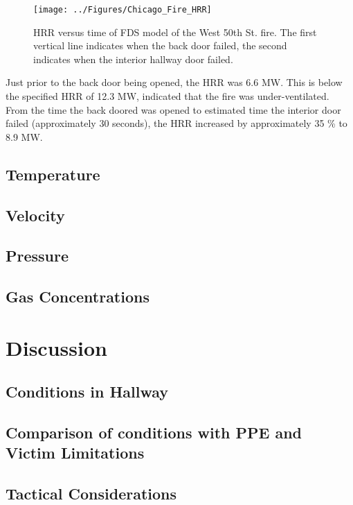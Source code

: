 \documentclass[11pt,oneside]{book}
\begin{document}
\begin{figure}[h!]
\centering
\texttt{[image: ../Figures/Chicago\_Fire\_HRR]}
\caption{HRR versus time of FDS model of the West 50th St. fire. The first vertical line indicates when the back door failed, the second indicates when the interior hallway door failed.}
\label{fig:hrr}
\end{figure}

Just prior to the back door being opened, the HRR was 6.6 MW. This is below the specified HRR of 12.3 MW, indicated that the fire was under-ventilated. From the time the back doored was opened to estimated time the interior door failed (approximately 30 seconds), the HRR increased by approximately 35 \% to 8.9 MW.



\section{Temperature}

\section{Velocity}

\section{Pressure}

\section{Gas Concentrations}

\chapter{Discussion}

\section{Conditions in Hallway}

\section{Comparison of conditions with PPE and Victim Limitations}

\section{Tactical Considerations}
\end{document}

